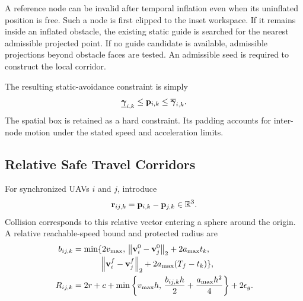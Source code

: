 A reference node can be invalid after temporal inflation even when its uninflated position is free. Such a node is first clipped to the inset workspace. If it remains inside an inflated obstacle, the existing static guide is searched for the nearest admissible projected point. If no guide candidate is available, admissible projections beyond obstacle faces are tested. An admissible seed is required to construct the local corridor.

The resulting static-avoidance constraint is simply
\begin{equation}
 \underline{\boldsymbol\gamma}_{i,k}\leq\mathbf{p}_{i,k}\leq\overline{\boldsymbol\gamma}_{i,k}.
 \label{eq:withinSTC}
\end{equation}
The spatial box is retained as a hard constraint. Its padding accounts for inter-node motion under the stated speed and acceleration limits.

\subsection{Relative Safe Travel Corridors}
For synchronized UAVs $i$ and $j$, introduce
\begin{equation}
 \mathbf r_{ij,k}=\mathbf{p}_{i,k}-\mathbf{p}_{j,k}\in\mathbb{R}^3.
 \label{eq:relative}
\end{equation}
Collision corresponds to this relative vector entering a sphere around the origin. A relative reachable-speed bound and protected radius are
\begin{subequations}\label{eq:relativepadding}\begin{align}
 b_{ij,k}&=\min\{2v_{\max},\,\norm{\bv_i^0-\bv_j^0}_2+2a_{\max}t_k,\nonumber\\[-2pt]
 &\hphantom{=\min\{}\norm{\bv_i^f-\bv_j^f}_2+2a_{\max}(T_f-t_k)\},\\
 R_{ij,k}&=2r+c+\min\left\{v_{\max}h,\,
 \frac{b_{ij,k}h}{2}+\frac{a_{\max}h^2}{4}\right\}+2\epsilon_g.
\end{align}\end{subequations}
